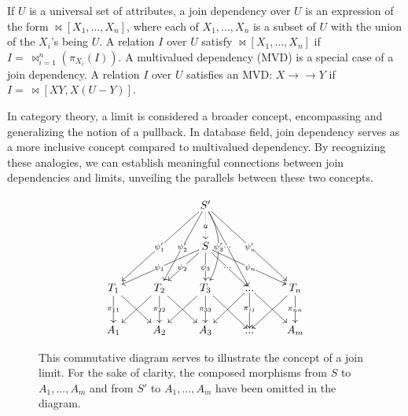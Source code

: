  If $U$ is a universal set of attributes, a join dependency over $U$ is an expression of the form $\bowtie[X_1,...,X_n]$, where each of $X_1,...,X_n$ is a subset of $U$ with the union of the $X_i$’s being $U$. A relation $I$ over $U$ satisfy $\bowtie[X_1,...,X_n]$ if $I = ~\bowtie^n_{i=1}(\pi_{X_i}(I))$. A multivalued dependency (MVD) is a special case of a join dependency.  A relation $I$ over $U$ satisfies an MVD: $X \to\to Y$ if $I = ~\bowtie[XY,X(U-Y)]$.  
 



In category theory,  a limit is considered a broader concept, encompassing and generalizing the notion of a pullback. In database field, join dependency serves as a more inclusive concept compared to multivalued dependency. By recognizing these analogies, we can establish meaningful connections between join dependencies and limits, unveiling the parallels between these two concepts.






\begin{figure}\centering
\[\xymatrix{
& & {S'} \ar@{.>}[d]|u \ar[ddll]|{\psi'_1} \ar[ddl]|{\psi'_2} \ar[ddr]|{\cdots} \ar[ddrr]|{\psi'_n} \ar@/^1pc/[dd]|{\psi'_3} \\
 & & {S}  \ar[dll]|{\psi_1} \ar[dl]|{\psi_2} \ar[d]|{\psi_3} \ar[dr]|{\cdots} \ar[drr]|{\psi_n} \\
T_1 \ar[dr] \ar[d]|{\pi_{11}}  & T_2  \ar[dl] \ar[dr]  \ar[d]|{\pi_{22}} & T_3 \ar[d]|{\pi_{33}} \ar[dl] \ar[dr] & ... \ar[d]|{\pi_{ij}} \ar[dl] \ar[dr] & T_n \ar[d]|{\pi_{nn}} \ar[dl] \\  
A_1 & A_2 & A_3 & ... & A_m
}
\]
\caption{This commutative diagram serves to illustrate the concept of a join limit. For the sake of clarity, the composed morphisms from $S$ to $A_1, ..., A_m$ and from $S'$ to $A_1, ..., A_m$ have been omitted in the diagram.  } \label{fig:joinlimitdiagram}
 \end{figure}


 

